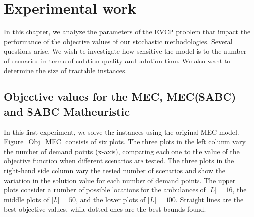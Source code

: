 \chapter{Experimental work}\label{cap:Exp}


In this chapter, we analyze the parameters of the EVCP problem that impact the performance of the objective values of our stochastic methodologies. Several questions arise. We wish to investigate how sensitive the model is to the number of scenarios in terms of solution quality and solution time. We also want to determine the size of tractable instances.

\section{Objective values for the MEC, MEC(SABC) and SABC Matheuristic}

In this first experiment, we solve the instances using the original MEC model.
 Figure~\ref{Obj_MEC} consists of six plots. The three plots in the left column vary the number of demand points (x-axis), comparing each one to the value of the objective function when different scenarios are tested. The three plots in the right-hand side column vary the tested number of scenarios and show the variation in the solution value for each number of demand points. The upper plots consider a number of possible locations for the ambulances of $|L|=16$, the middle plots of $|L|=50$, and the lower plots of $|L|=100$. Straight lines are the best objective values, while dotted ones are the best bounds found.

